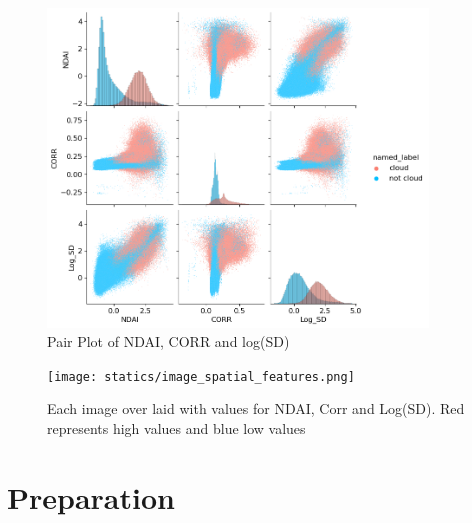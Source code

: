 \documentclass[11pt, letterpaper, journal]{IEEEtran}
\begin{document}
\begin{figure}[!h]
\centering
\includegraphics[width=0.9\textwidth]{statics/example_pair_plot.png}
\caption{Pair Plot of NDAI, CORR and log(SD)}
\label{fig:covariate_dist}
\end{figure}

\begin{figure}[!h]
\centering
\texttt{[image: statics/image\_spatial\_features.png]}
\caption{Each image over laid with values for NDAI, Corr and Log(SD). Red represents high values and blue low values}
\label{fig:spatial_dist_covariates}
\end{figure}


\section{Preparation}
\end{document}
